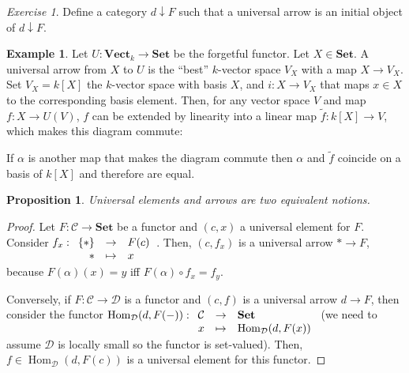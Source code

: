 \documentclass{article}
\newcommand{\cat}{\mathcal{C}}
\newcommand{\catt}{\mathcal{D}}
\newcommand{\Set}{\mathbf{Set}}
\newcommand{\Vectcat}{\mathbf{Vect}}
\DeclareMathOperator{\Hom}{Hom}
\newcommand{\applic}[4]{\begin{array}[t]{rcl}
#1 & \to & #2 \\
#3 & \mapsto & #4
\end{array}}
\theoremstyle{plain}
\newtheorem{proposition}[theorem]{Proposition}
\theoremstyle{definition}
\newtheorem{example}[theorem]{Example}
\theoremstyle{remark}
\newtheorem*{exercise}{Exercise}
\begin{document}
\begin{exercise}
    Define a category $d \downarrow F$ such that a universal arrow is an initial object of $d \downarrow F$.
\end{exercise}

\begin{example}
    Let $U : \Vectcat_k \to \Set$ be the forgetful functor. Let $X \in \Set$. A universal arrow from $X$ to $U$ is the ``best'' $k$-vector space $V_X$ with a map $X \to V_X$. Set $V_X = k[X]$ the $k$-vector space with basis $X$, and $i : X \to V_X$ that maps $x \in X$ to the corresponding basis element. Then, for any vector space $V$ and map $f : X \to U(V)$, $f$ can be extended by linearity into a linear map $\tilde{f} : k[X] \to V$, which makes this diagram commute:
    \begin{center}
    \end{center}
    If $\alpha$ is another map that makes the diagram commute then $\alpha$ and $\tilde{f}$ coincide on a basis of $k[X]$ and therefore are equal.
\end{example}

\begin{proposition}
    Universal elements and arrows are two equivalent notions.
\end{proposition}

\begin{proof}
    Let $F : \cat \to \Set$ be a functor and $(c,x)$ a universal element  for $F$. Consider $f_x : \applic{\{*\}}{F(c)}{*}{x}$. Then, $(c,f_x)$ is a universal arrow $*\to F$, because $F(\alpha)(x)=y$ iff $F(\alpha)\circ f_x = f_y$.
    \begin{center}
    \end{center}
    Conversely, if $F : \cat \to \catt$ is a functor and $(c,f)$ is a universal arrow $d \to F$, then consider the functor $\Hom_\catt (d,F(-)) : \applic{\cat}{\Set}{x}{\Hom_\catt (d,F(x))}$ (we need to assume $\catt$ is locally small so the functor is set-valued). Then, $f \in \Hom_\catt (d,F(c))$ is a universal element for this functor.
\end{proof}
\end{document}
